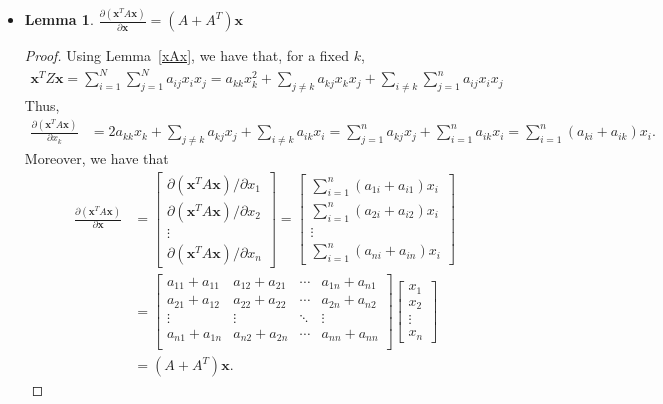 \documentclass[10pt]{article}
\newtheorem{lemma}{Lemma}[section]
\newcommand{\x}{\mathbf{x}}
\begin{document}
\begin{itemize}
    \item \begin{lemma} \label{bilinear-deriv}
      $\frac{\partial (\x^T A \x)}{\partial \x} = (A + A^T) \x$
    \end{lemma}
    \begin{proof}
      Using Lemma~\ref{xAx}, we have that, for a fixed $k$,
      \begin{align*}
        \x^T Z \x = \sum_{i=1}^N \sum_{j=1}^N a_{ij}x_i x_j
        = a_{kk}x_k^2 + \sum_{j\neq k} a_{kj} x_k x_j + \sum_{i\neq k} \sum_{j=1}^n a_{ij} x_i x_j
      \end{align*}
      Thus,
      \begin{align*}
        \frac{\partial(\x^T A \x)}{\partial x_k} 
        &= 2a_{kk}x_k + \sum_{j \neq k} a_{kj} x_j + \sum_{i\neq k} a_{ik}x_i
        = \sum_{j=1}^n a_{kj} x_j + \sum_{i=1}^n a_{ik}x_i 
        = \sum_{i=1}^n (a_{ki} + a_{ik})x_i.
      \end{align*}
      Moreover, we have that
      \begin{align*}
        \frac{\partial(\x^T A \x)}{\partial \x} 
        &= \begin{bmatrix}
          \partial(\x^T A \x)/\partial x_1\\
          \partial(\x^T A \x)/\partial x_2\\
          \vdots\\
          \partial(\x^T A \x)/\partial x_n
        \end{bmatrix}
        = \begin{bmatrix}
          \sum_{i=1}^n (a_{1i} + a_{i1})x_i\\
          \sum_{i=1}^n (a_{2i} + a_{i2})x_i\\
          \vdots\\
          \sum_{i=1}^n (a_{ni} + a_{in})x_i
        \end{bmatrix}\\
        &= \begin{bmatrix}
        a_{11}+a_{11} & a_{12}+a_{21} & \cdots & a_{1n}+a_{n1}\\
        a_{21}+a_{12} & a_{22}+a_{22} & \cdots & a_{2n}+a_{n2}\\
        \vdots & \vdots & \ddots & \vdots \\
        a_{n1}+a_{1n} & a_{n2}+a_{2n} & \cdots & a_{nn}+a_{nn}\\
        \end{bmatrix}        
        \begin{bmatrix}
          x_1 \\ x_2 \\ \vdots \\ x_n
        \end{bmatrix}\\
        &= (A + A^T)\x.
      \end{align*}      
    \end{proof}    
    

\end{itemize}
\end{document}
